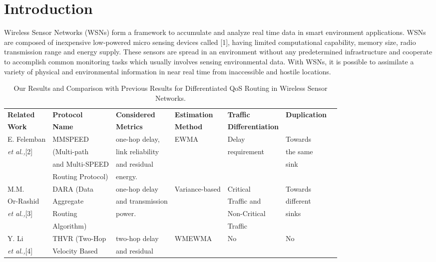 \documentclass[fleqn,twoside]{article}
\begin{document}
\section{Introduction}
\label{section:Introduction}
Wireless Sensor Networks (WSNs) form a framework to accumulate and analyze real time data in smart environment applications. WSNs are composed of inexpensive low-powered micro sensing devices called [1], having limited computational capability, memory size, radio transmission range and energy supply.
These sensors are spread in an environment without any predetermined infrastructure and cooperate to accomplish common monitoring tasks which usually involves sensing environmental data. With WSNs, it is possible to assimilate a variety of physical and environmental information in near real time from inaccessible and hostile locations. 
\newcommand {\otoprule}{\midrule [\heavyrulewidth]}  \begin{table*}
\centering
\caption{Our Results and Comparison with Previous Results for Differentiated QoS Routing in Wireless Sensor Networks.}
\begin{center}
\scriptsize	
\begin{tabular}{lllllll}
    \hline
\bfseries {Related} & \bfseries {Protocol} & \bfseries {Considered} & \bfseries {Estimation} & \bfseries {Traffic} & \bfseries {Duplication} \\ 
\bfseries {Work}    &  \bfseries {Name}    & \bfseries {Metrics}    & \bfseries {Method} & \bfseries {Differentiation} & \bfseries \\
\hline
    E. Felemban & MMSPEED &one-hop delay, &EWMA &Delay &Towards \\
    \emph{et al.,}[2] &(Multi-path &link reliability & &requirement &the same \\
    &and Multi-SPEED &and residual & & &sink \\
    &Routing Protocol) &energy. & & & &\\
\hline
    M.M. & DARA (Data  &one-hop delay &Variance-based &Critical &Towards \\
    Or-Rashid  &Aggregate &and transmission & &Traffic and &different \\
    \emph{et al.,}[3] &Routing  &power. & &Non-Critical &sinks \\
    &Algorithm) & & &Traffic &\\
\hline
    Y. Li & THVR (Two-Hop &two-hop delay &WMEWMA &No &No \\
    \emph{et al.,}[4] &Velocity Based &and residual & & & \\

\end{tabular}
\end{center}
\end{table*}
\end{document}
